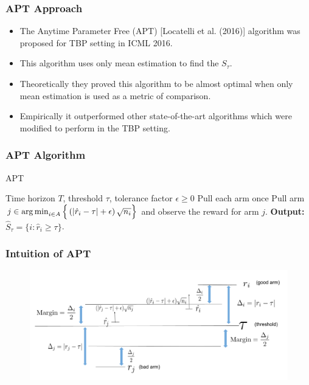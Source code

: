\begin{frame}
\frametitle{APT Approach}
\begin{itemize}
\item<1-> The Anytime Parameter Free (APT) [{Locatelli et al. (2016)}] algorithm was proposed for TBP setting in ICML 2016. 
\item<2-> This algorithm uses only mean estimation to find the $S_{\tau}$. 
\item<3-> Theoretically they proved this algorithm to be almost optimal when only mean estimation is used as a metric of comparison.
\item<4-> Empirically it outperformed other state-of-the-art algorithms which were modified to perform in the TBP setting.  
\end{itemize}
\end{frame}

\begin{frame}
\frametitle{APT Algorithm}
\begin{algorithm}[H]
\caption{APT}
\begin{algorithmic}
 Time horizon $T$, threshold $\tau$, tolerance factor $\epsilon\geq 0$
\State Pull each arm once
\vspace{-3mm}
\State {}
\State Pull arm $j\in\operatorname*{arg\,min}_{i\in A}\Big\lbrace \left(|\hat{r}_{i} - \tau | + \epsilon\right)\sqrt{n_i}\Big\rbrace$ and observe the reward for arm $j$.
\EndFor
\State \textbf{Output:} $\hat{S}_{\tau}=\lbrace i: \hat{r}_{i}\geq \tau \rbrace$.
\end{algorithmic}
\end{algorithm}
\end{frame}


\begin{frame}
\frametitle{Intuition of APT}
\begin{figure}
\includegraphics[scale=0.278]{img/APT_intuition.png}
\end{figure}
\end{frame}





